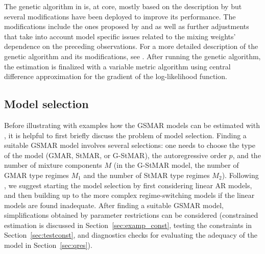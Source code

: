 \documentclass[nojss]{jss} %
\begin{document}
The genetic algorithm in  is, at core, mostly based on the description by \cite{Dorsey+Mayer:1995} but several modifications have been deployed to improve its performance. The modifications include the ones proposed by \cite{Patnaik+Srinivas:1994} and \cite{Smith+Dike+Stegmann:1995} as well as further adjustments that take into account model specific issues related to the mixing weights' dependence on the preceding observations. For a more detailed description of the genetic algorithm and its modifications, see \citet[Appendix A]{Virolainen:2020}. After running the genetic algorithm, the estimation is finalized with a variable metric algorithm \cite[algorithm 21, implemented by \citealp{R}]{Nash:1990} using central difference approximation for the gradient of the log-likelihood function.


\subsection{Model selection}\label{sec:modelselection}

Before illustrating with examples how the GSMAR models can be estimated with , it is helpful to first briefly discuss the problem of model selection. Finding a suitable GSMAR model involves several selections: one needs to choose the type of the model (GMAR, StMAR, or G-StMAR), the autoregressive order $p$, and the number of mixture components $M$ (in the G-StMAR model, the number of GMAR type regimes $M_1$ and the number of StMAR type regimes $M_2$). Following \citet[Section 3.1]{Kalliovirta+Meitz+Saikkonen:2015}, we suggest starting the model selection by first considering linear AR models, and then building up to the more complex regime-switching models if the linear models are found inadequate. After finding a suitable GSMAR model, simplifications obtained by parameter restrictions can be considered (constrained estimation is discussed in Section~\ref{sec:examp_const}, testing the constraints in Section~\ref{sec:testconst}, and diagnostics checks for evaluating the adequacy of the model in Section~\ref{sec:qres}).
\end{document}
